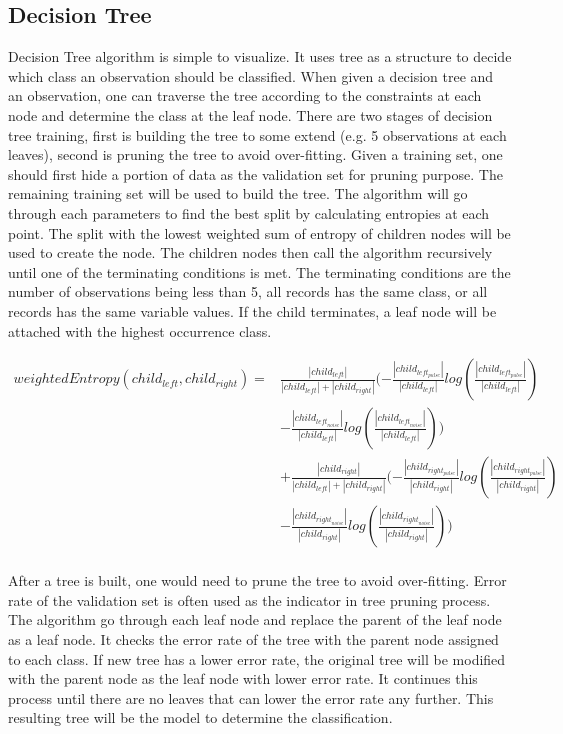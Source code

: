 \documentclass[twoside]{article}
\begin{document}
\subsection{Decision Tree}
Decision Tree algorithm is simple to visualize. It uses tree as a structure to decide which class an observation should be classified. When given a decision tree and an observation, one can traverse the tree according to the constraints at each node and determine the class at the leaf node. There are two stages of decision tree training, first is building the tree to some extend (e.g. 5 observations at each leaves), second is pruning the tree to avoid over-fitting. Given a training set, one should first hide a portion of data as the validation set for pruning purpose. The remaining training set will be used to build the tree. The algorithm will go through each parameters to find the best split by calculating entropies at each point. The split with the lowest weighted sum of entropy of children nodes will be used to create the node. The children nodes then call the algorithm recursively until one of the terminating conditions is met. The terminating conditions are the number of observations being less than 5, all records has the same class, or all records has the same variable values. If the child terminates, a leaf node will be attached with the highest occurrence class.

\begin{align*}
weightedEntropy(child_{left}, child_{right}) =& \frac{|child_{left}|}{|child_{left}| + |child_{right}|}(- \frac{|child_{left_{pulse}}|}{|child_{left}|}log(\frac{|child_{left_{pulse}}|}{|child_{left}|}) \\
&- \frac{|child_{left_{noise}}|}{|child_{left}|}log(\frac{|child_{left_{noise}}|}{|child_{left}|}))\\
&+\frac{|child_{right}|}{|child_{left}| + |child_{right}|}(- \frac{|child_{right_{pulse}}|}{|child_{right}|}log(\frac{|child_{right_{pulse}}|}{|child_{right}|}) \\
&- \frac{|child_{right_{noise}}|}{|child_{right}|}log(\frac{|child_{right_{noise}}|}{|child_{right}|}))\\
\end{align*}

After a tree is built, one would need to prune the tree to avoid over-fitting. Error rate of the validation set is often used as the indicator in tree pruning process. The algorithm go through each leaf node and replace the parent of the leaf node as a leaf node. It checks the error rate of the tree with the parent node assigned to each class. If new tree has a lower error rate, the original tree will be modified with the parent node as the leaf node with lower error rate. It continues this process until there are no leaves that can lower the error rate any further. This resulting tree will be the model to determine the classification. 
\end{document}

